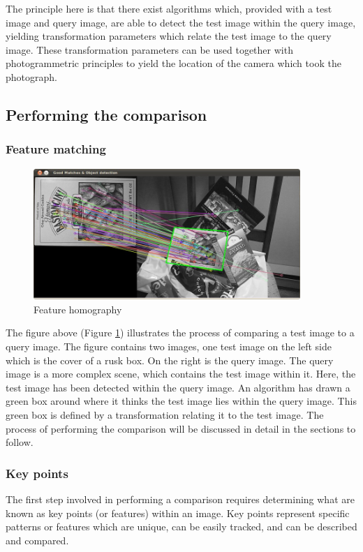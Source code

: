 \documentclass[11pt,a4paper]{report}
\begin{document}
		The principle here is that there exist algorithms which, provided with a test image and query image, are able to detect the test image within the query image, yielding transformation parameters which relate the test image to the query image. These transformation parameters can be used together with photogrammetric principles to yield the location of the camera which took the photograph.
		
		\subsection{Performing the comparison}
			\subsubsection{Feature matching}
				\begin{figure}[H]
					\centering
					\includegraphics[width=0.9\textwidth]{feature_homography_example}
					\caption{Feature homography}
					\label{fig:feature_homogrophy}
				\end{figure}
				
				The figure above (Figure \ref{fig:feature_homogrophy}) illustrates the process of comparing a test image to a query image. The figure contains two images, one test image on the left side which is the cover of a rusk box. On the right is the query image. The query image is a more complex scene, which contains the test image within it. Here, the test image has been detected within the query image. An algorithm has drawn a green box around where it thinks the test image lies within the query image. This green box is defined by a transformation relating it to the test image. The process of performing the comparison will be discussed in detail in the sections to follow.
			
			\subsubsection{Key points}
				The first step involved in performing a comparison requires determining what are known as key points (or features) within an image. Key points represent specific patterns or features which are unique, can be easily tracked, and can be described and compared.
				
\end{document}
